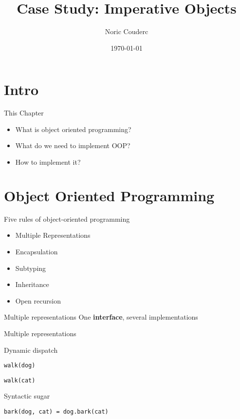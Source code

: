 \documentclass[presentation,xcolor=svgnames]{beamer}
\author{Noric Couderc}
\date{\today}
\title{Case Study: Imperative Objects}
\begin{document}
\maketitle

\section{Intro}
\begin{frame}
  \begin{block}{This Chapter}
  \begin{itemize}
  \item What is object oriented programming?
  \item What do we need to implement OOP?
  \item How to implement it?
  \end{itemize}
  \end{block}
\end{frame}

\section{Object Oriented Programming}


\begin{frame}{Five rules of object-oriented programming}
\begin{itemize}
\item Multiple Representations
\item Encapsulation
\item Subtyping
\item Inheritance
\item Open recursion
\end{itemize}
\end{frame}

\begin{frame}[fragile]{Multiple representations}
  \centering
  One \textbf{interface}, several implementations
\end{frame}

\begin{frame}[fragile]{Multiple representations}
\begin{block}{Dynamic dispatch}
\begin{verbatim}
walk(dog)
\end{verbatim}
\begin{verbatim}
walk(cat)
\end{verbatim}
\end{block}

\begin{block}{Syntactic sugar}
\begin{verbatim}
bark(dog, cat) = dog.bark(cat)
\end{verbatim}
\end{block}
\end{frame}
\end{document}
